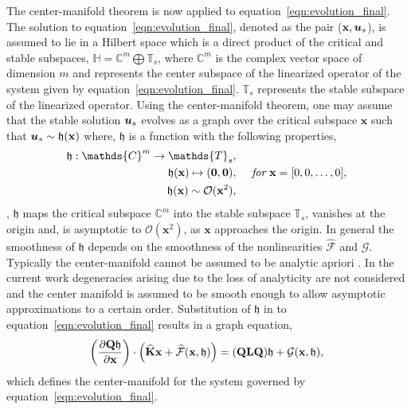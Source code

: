 The center-manifold theorem is now applied to equation~\eqref{eqn:evolution_final}. 	The solution to equation~\eqref{eqn:evolution_final}, denoted as the pair ($\mathbf{x},\boldsymbol{u}_{s}$), is assumed to lie in a Hilbert space which is a direct product of the critical and stable subspaces, $\mathds{H} = \mathds{C}^{m} \bigoplus \mathds{T}_{s}$, where $\mathds{C}^{m}$ is the complex vector space of dimension $m$ and represents the center subspace of the linearized operator of the system given by equation~\eqref{eqn:evolution_final}. $\mathds{T}_{s}$ represents the stable subspace of the linearized operator. 
%
Using the center-manifold theorem, one may assume that the stable solution $\boldsymbol{u}_{s}$ evolves as a graph over the critical subspace $\mathbf{x}$ such that $\boldsymbol{u}_{s} \sim \mathfrak{h}(\mathbf{x})$ where, $\mathfrak{h}$ is a function with the following properties,
\begin{eqnarray}
	\label{eqn:CM_approx_properties}
	\mathfrak{h}: \mathds{C}^{m} \to \mathds{T}_{s}, & \nonumber \\
	\mathfrak{h}(\mathbf{x}) \mapsto (\boldsymbol{0},\vfield{0}), & \hspace{5mm} \textit{for}\ \mathbf{x} = [0,0,\ldots,0] , \nonumber \\
	\mathfrak{h}(\mathbf{x}) \sim \mathcal{O}(\mathbf{x}^{2}), & \nonumber
\end{eqnarray}
\ie, $\mathfrak{h}$ maps the critical subspace $\mathds{C}^{m}$ into the stable subspace $\mathds{T}_{s}$, vanishes at the origin and, is asymptotic to $\mathcal{O}(\mathbf{x}^{2})$, as $\mathbf{x}$ approaches the origin. 
In general the smoothness of $\mathfrak{h}$ depends on the smoothness of the nonlinearities $\mathcal{\widehat{F}}$ and $\mathcal{G}$. Typically the center-manifold cannot be assumed to be analytic apriori \citep{carr82,sijbrand85}. In the current work degeneracies arising due to the loss of analyticity are not considered and the center manifold is assumed to be smooth enough to allow asymptotic approximations to a certain order. Substitution of $\mathfrak{h}$ in to equation~\eqref{eqn:evolution_final} results in a graph equation,
\begin{align}
	\label{eqn:graph_equation}
	\left(\frac{\partial \mathbf{Q}\mathfrak{h}}{\partial \mathbf{x}}\right)\cdot \left(\mathbf{\widehat{K}}\mathbf{x} + \mathcal{\widehat{F}}(\mathbf{x},\mathfrak{h}) \right) = (\mathbf{Q}\mathbf{L}\mathbf{Q})\mathfrak{h} + \mathcal{G}(\mathbf{x},\mathfrak{h}),
\end{align}
which defines the center-manifold for the system governed by equation~\eqref{eqn:evolution_final}. 

